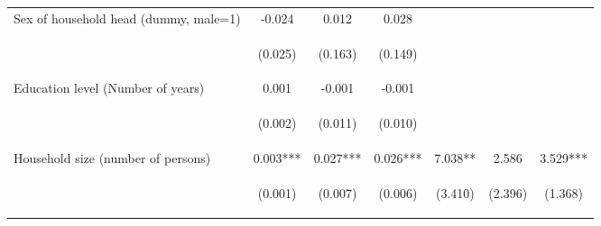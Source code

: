\begin{center}
\begin{tabular}{lcccccc}
Sex of household head (dummy, male=1) & -0.024 & 0.012 & 0.028 &  &  &  \\
\vspace{4pt} & \begin{footnotesize}(0.025)\end{footnotesize} & \begin{footnotesize}(0.163)\end{footnotesize} & \begin{footnotesize}(0.149)\end{footnotesize} & \begin{footnotesize}\end{footnotesize} & \begin{footnotesize}\end{footnotesize} & \begin{footnotesize}\end{footnotesize} \\
Education level (Number of years) & 0.001 & -0.001 & -0.001 &  &  &  \\
\vspace{4pt} & \begin{footnotesize}(0.002)\end{footnotesize} & \begin{footnotesize}(0.011)\end{footnotesize} & \begin{footnotesize}(0.010)\end{footnotesize} & \begin{footnotesize}\end{footnotesize} & \begin{footnotesize}\end{footnotesize} & \begin{footnotesize}\end{footnotesize} \\
Household size (number of persons) & 0.003*** & 0.027*** & 0.026*** & 7.038** & 2.586 & 3.529*** \\
\vspace{4pt} & \begin{footnotesize}(0.001)\end{footnotesize} & \begin{footnotesize}(0.007)\end{footnotesize} & \begin{footnotesize}(0.006)\end{footnotesize} & \begin{footnotesize}(3.410)\end{footnotesize} & \begin{footnotesize}(2.396)\end{footnotesize} & \begin{footnotesize}(1.368)\end{footnotesize} \\

\end{tabular}
\end{center}
